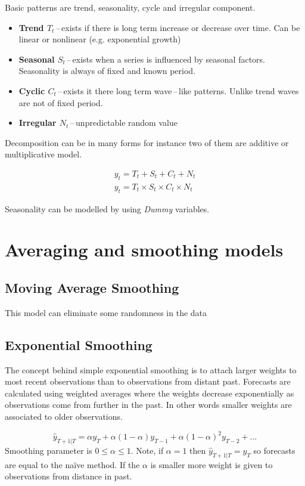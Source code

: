 Basic patterns are trend, seasonality, cycle and irregular component. 

\begin{itemize}
    \item \textbf{Trend $ T_{t} $}\,--\,exists if there is long term increase or decrease over
        time. Can be linear or nonlinear (e.g. exponential growth)
    \item \textbf{Seasonal $ S_{t} $}\,--\,exists when a series is influenced by seasonal factors.
        Seasonality is always of fixed and known period.
    \item \textbf{Cyclic $ C_{t} $}\,--\,exists it there long term wave\,--\,like patterns.
        Unlike trend waves are not of fixed period.
    \item \textbf{Irregular $ N_{t} $}\,--\,unpredictable random value
\end{itemize}

Decomposition can be in many forms for instance two of them are additive or multiplicative model.

\begin{eqnarray}
    y_{t} = T_{t} + S_{t} + C_{t} + N_{t} \\
    y_{t} = T_{t} \times S_{t} \times C_{t} \times N_{t} 
\end{eqnarray}

Seasonality can be modelled by using \emph{Dummy} variables.



\section{Averaging and smoothing models}
\subsection{Moving Average Smoothing}
This model can eliminate some randomness in the data 
\subsection{Exponential Smoothing}
The concept behind simple exponential smoothing is to attach 
larger weights to most recent observations than to observations from distant
past. Forecasts are calculated using weighted averages where the weights 
decrease exponentially as observations come from further in the past.
In other words smaller weights are associated to older observations.

$$ \hat{y}_{T+1|T} = \alpha y_{T} + \alpha(1-\alpha)y_{T-1} +
    \alpha(1-\alpha)^2 y_{T-2} +\dots $$
Smoothing parameter is $ 0 \leq \alpha \leq 1 $. Note, if $\alpha = 1$ then 
$\hat{y}_{T+1|T} = y_{T}$ so forecasts are equal to the na\"{i}ve method.
If the $\alpha $ is smaller more weight is given to observations from distance
in past. 

